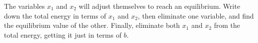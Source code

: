 The variables
$x_1$ and $x_2$ will adjust themselves to reach an equilibrium. Write down the total
energy in terms of $x_1$ and $x_2$, then eliminate one variable, and find the
equilibrium value of the other. Finally, eliminate both $x_1$ and $x_2$ from the
total energy, getting it just in terms of $b$.
